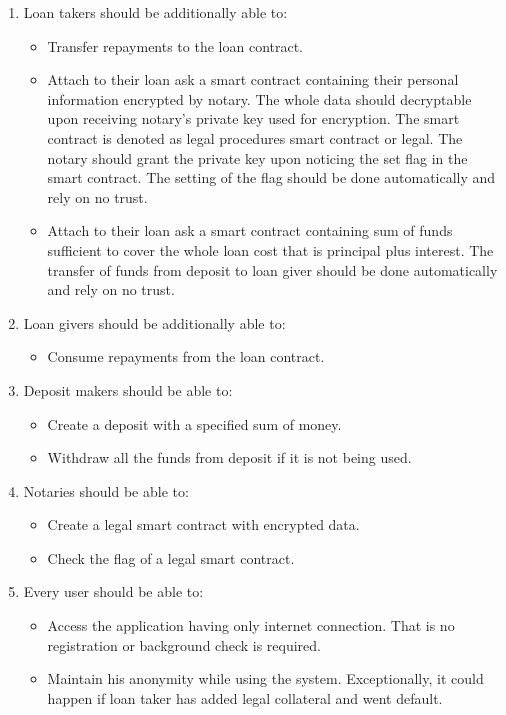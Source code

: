 \documentclass[a4paper,12pt,twoside,openany]{report}
\begin{document}
\begin{enumerate}
\item Loan takers should be additionally able to:
\begin{itemize}
\item Transfer repayments to the loan contract.
\item Attach to their loan ask a smart contract containing their personal information encrypted by notary. The whole data should decryptable upon receiving notary's private key used for encryption. The smart contract is denoted as legal procedures smart contract or legal. The notary should grant the private key upon noticing the set flag in the smart contract. The setting of the flag should be done automatically and rely on no trust.
\item Attach to their loan ask a smart contract containing sum of funds sufficient to cover the whole loan cost that is principal plus interest. The transfer of funds from deposit to loan giver should be done automatically and rely on no trust.
\end{itemize}

\item Loan givers should be additionally able to:
\begin{itemize}
\item Consume repayments from the loan contract.
\end{itemize}

\item Deposit makers should be able to:
\begin{itemize}
\item Create a deposit with a specified sum of money.
\item Withdraw all the funds from deposit if it is not being used.
\end{itemize}

\item Notaries should be able to:
\begin{itemize}
\item Create a legal smart contract with encrypted data.
\item Check the flag of a legal smart contract.
\end{itemize}

\item Every user should be able to:
\begin{itemize}
\item Access the application having only internet connection. That is no registration or background check is required.
\item Maintain his anonymity while using the system. Exceptionally, it could happen if loan taker has added legal collateral and went default.
\end{itemize}
\end{enumerate}
\end{document}

